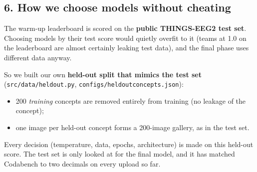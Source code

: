 \documentclass[
  11pt,
]{article}
\providecommand{\tightlist}{%
  \setlength{\itemsep}{0pt}\setlength{\parskip}{0pt}}
\renewcommand{\_}{\oldunderscore\allowbreak}
\begin{document}
\subsection{6. How we choose models
without
cheating}\label{how-we-choose-models-without-cheating}

The warm-up leaderboard is scored on the
\textbf{public THINGS-EEG2 test set}.
Choosing models by their test score
would quietly overfit to it (teams at
1.0 on the leaderboard are almost
certainly leaking test data), and the
final phase uses different data anyway.

So we built our own \textbf{held-out
split that mimics the test set}
(\texttt{src/data/heldout.py},
\texttt{configs/heldout\_concepts.json}):

\begin{itemize}
\tightlist
\item
  200 \emph{training} concepts are
  removed entirely from training (no
  leakage of the concept);
\item
  one image per held-out concept forms a
  200-image gallery, as in the test set.
\end{itemize}

Every decision (temperature, data,
epochs, architecture) is made on this
held-out score. The test set is only
looked at for the final model, and it
has matched Codabench to two decimals on
every upload so far.
\end{document}
